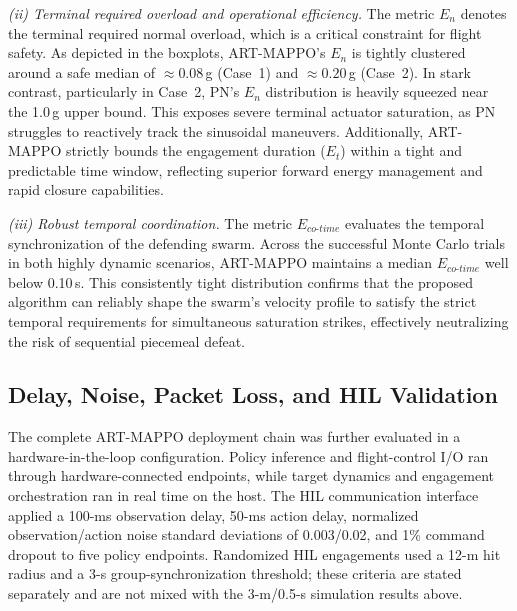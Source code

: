 \documentclass[lettersize,journal]{IEEEtran}
\providecommand{\DIFadd}[1]{{\protect\color{blue} #1}} %
\providecommand{\DIFaddbegin}{} %
\begin{document}
\emph{(ii) Terminal required overload and operational efficiency.} The metric $E_n$ denotes the terminal required normal overload, which is a critical constraint for flight safety. As depicted in the boxplots, ART-MAPPO's $E_n$ is tightly clustered around a safe median of $\approx0.08$\,g (Case~1) and $\approx0.20$\,g (Case~2). In stark contrast, particularly in Case~2, PN's $E_n$ distribution is heavily squeezed near the 1.0\,g upper bound. This exposes severe terminal actuator saturation, as PN struggles to reactively track the sinusoidal maneuvers. Additionally, ART-MAPPO strictly bounds the engagement duration ($E_t$) within a tight and predictable time window, reflecting superior forward energy management and rapid closure capabilities.

\emph{(iii) Robust temporal coordination.} The metric $E_{co\text{-}time}$ evaluates the temporal synchronization of the defending swarm. Across the successful Monte Carlo trials in both highly dynamic scenarios, ART-MAPPO maintains a median $E_{co\text{-}time}$ well below 0.10\,s. This consistently tight distribution confirms that the proposed algorithm can reliably shape the swarm's velocity profile to satisfy the strict temporal requirements for simultaneous saturation strikes, effectively neutralizing the risk of sequential piecemeal defeat.

\DIFaddbegin \clearpage
\subsection{\DIFadd{Delay, Noise, Packet Loss, and HIL Validation}}
\label{subsec:hil}

\DIFadd{The complete ART-MAPPO deployment chain was further evaluated in a
hardware-in-the-loop configuration. Policy inference and flight-control I/O
ran through hardware-connected endpoints, while target dynamics and engagement
orchestration ran in real time on the host. The HIL communication interface
applied a 100-ms observation delay, 50-ms action delay, normalized
observation/action noise standard deviations of 0.003/0.02, and 1\% command
dropout to five policy endpoints. Randomized HIL engagements used a 12-m hit
radius and a 3-s group-synchronization threshold; these criteria are stated
separately and are not mixed with the 3-m/0.5-s simulation results above.
}
\end{document}

